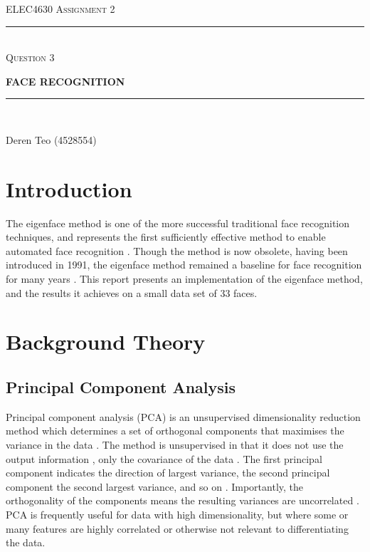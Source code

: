 \begin{titlepage}
  \centering

  \textsc{ELEC4630 Assignment 2}\\
  \vspace{9cm}

  \rule{\linewidth}{0.5pt}\\

  \vspace{1em}
  \LARGE\textsc{Question 3}\\
  \vspace{1em}

  \LARGE\uppercase{\textbf{{Face Recognition}}}\\

  \rule{\linewidth}{2pt}\\

  \vfill

  \normalsize{Deren Teo (4528554)}
  \vspace{1cm}

\end{titlepage}

\section{Introduction}

The eigenface method is one of the more successful traditional face recognition techniques, and represents the first sufficiently effective method to enable automated face recognition \cite{rosebrock_2021}. Though the method is now obsolete, having been introduced in 1991, the eigenface method remained a baseline for face recognition for many years \cite{elec4630_2023}. This report presents an implementation of the eigenface method, and the results it achieves on a small data set of 33 faces.

\section{Background Theory}

\subsection{Principal Component Analysis}

Principal component analysis (PCA) is an unsupervised dimensionality reduction method which determines a set of orthogonal components that maximises the variance in the data \cite{alpaydin_2020} \cite{lovell_2008}. The method is unsupervised in that it does not use the output information \cite{alpaydin_2020}, only the covariance of the data \cite{lovell_2008}. The first principal component indicates the direction of largest variance, the second principal component the second largest variance, and so on \cite{alpaydin_2020}. Importantly, the orthogonality of the components means the resulting variances are uncorrelated \cite{alpaydin_2020}. PCA is frequently useful for data with high dimensionality, but where some or many features are highly correlated or otherwise not relevant to differentiating the data.

